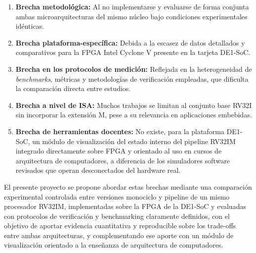 \begin{enumerate}
    \item[(i)] \textbf{Brecha metodológica:} Al no implementarse y evaluarse de
          forma conjunta ambas microarquitecturas del mismo núcleo bajo
          condiciones experimentales idénticas.

    \item[(ii)] \textbf{Brecha plataforma-específica:} Debida a la escasez de datos
          detallados y comparativos para la FPGA Intel Cyclone V presente en
          la tarjeta DE1-SoC.

    \item[(iii)] \textbf{Brecha en los protocolos de medición:} Reflejada en la
          heterogeneidad de \textit{benchmarks}, métricas y metodologías de
          verificación empleadas, que dificulta la comparación directa entre
          estudios.\parencite{Heinz2019Catalog}

    \item[(iv)] \textbf{Brecha a nivel de ISA:} Muchos trabajos se limitan al
          conjunto base RV32I sin incorporar la extensión M, pese a su
          relevancia en aplicaciones embebidas.
          \parencite{Goh2024UTHMRISCV,RISCVFoundation2019}

    \item[(v)] \textbf{Brecha de herramientas docentes:} No existe, para la
          plataforma DE1-SoC, un módulo de visualización del estado interno
          del pipeline RV32IM integrado directamente sobre FPGA y orientado
          al uso en cursos de arquitectura de computadores, a diferencia de
          los simuladores software revisados que operan desconectados del
          hardware real.\parencite{Heinz2019Catalog,Harris2021Digital}
\end{enumerate}

El presente proyecto se propone abordar estas brechas mediante una comparación
experimental controlada entre versiones monociclo y pipeline de un mismo
procesador RV32IM, implementadas sobre la FPGA de la DE1-SoC y evaluadas con
protocolos de verificación y benchmarking claramente definidos, con el objetivo
de aportar evidencia cuantitativa y reproducible sobre los trade-offs entre
ambas arquitecturas, y complementando ese aporte con un módulo de visualización orientado a la enseñanza de arquitectura de computadores.



